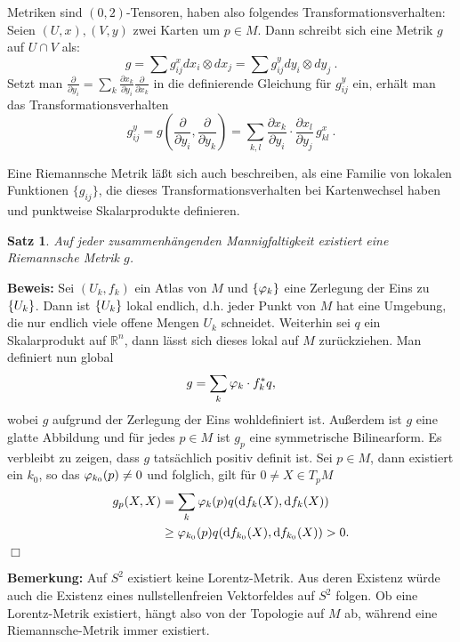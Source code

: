 \documentclass[12pt,a4paper]{article}
\def\R{\mathbb{R}}
\newtheorem{Satz}[Lemma]{Satz}
\def\proof{\noindent\textbf{Beweis:}\quad}
\def\qed{\quad\hfill\ensuremath{\Box}}
\begin{document}
\bigskip

Metriken sind $(0,2)$-Tensoren, haben also folgendes Transformationsverhalten:
Seien $(U, x), (V, y)$  zwei Karten um $p \in M$. Dann schreibt sich eine Metrik
$g$ auf $U \cap V$ als:
$$
g = \sum g_{ij}^x dx_i \otimes dx_j = \sum g_{ij}^y dy_i \otimes dy_j \ .
$$
Setzt man
$
\frac{\partial}{\partial y_i } = \sum_k \frac{\partial x_k }{\partial y_i} \frac{\partial}{\partial x_k}
$
in die definierende Gleichung f\"ur $g^y_{ij}$ ein, erh\"alt man das
Transformationsverhalten $$
g_{ij}^y
=
g\left(\frac{\partial}{\partial y_i}, \frac{\partial}{\partial y_k}\right)
=
\sum_{k, l} \frac{\partial x_k}{\partial y_i}\cdot \frac{\partial x_l }{\partial y_j}\,g_{kl}^x \ .
$$


Eine Riemannsche Metrik l\"a\ss t sich auch beschreiben, als eine Familie von lokalen
Funktionen $\{ g_{ij} \}$, die dieses Transformationsverhalten bei Kartenwechsel haben und punktweise
Skalarprodukte definieren.


\bigskip

\begin{Satz}
 Auf jeder zusammenh\"angenden Mannigfaltigkeit existiert eine Riemannsche Metrik $g$.
\end{Satz}
\proof
Sei $(U_k,f_k)$ ein Atlas von $M$ und $\{\varphi_k\}$ eine
Zerlegung der Eins zu $\{U_k\}$. Dann ist $\{U_k\}$ lokal endlich, d.h.
jeder Punkt von $M$ hat eine Umgebung, die nur endlich viele offene Mengen $U_k$
schneidet. Weiterhin sei $q$ ein Skalarprodukt auf $\R^n$, dann l\"asst sich
dieses lokal auf $M$ zur\"uckziehen. Man definiert nun global 
$$
g = \sum_{k} \varphi_k \cdot f_k^*q,
$$
wobei $g$ aufgrund der Zerlegung der Eins wohldefiniert ist. Au\ss{}erdem ist $g$ 
eine glatte Abbildung und f\"ur jedes $p\in M$ ist $g_p$ eine symmetrische
Bilinearform. Es verbleibt zu zeigen, dass $g$ tats\"achlich positiv definit ist. Sei $p\in M$, dann existiert ein
$k_0$, so das $\varphi_{k_0}(p) \neq 0$ und folglich, gilt f\"ur $0\neq X\in T_pM$
\begin{align*}
g_p(X,X) &= \sum_k \varphi_k(p) q(\mathrm{d}f_k(X),\mathrm{d}f_k(X))\\
&\ge \varphi_{k_0}(p) q(\mathrm{d}f_{k_0}(X),\mathrm{d}f_{k_0}(X)) > 0.
\end{align*}
\qed

\bigskip

{\bf Bemerkung:}
Auf $S^2$ existiert keine Lorentz-Metrik. Aus deren Existenz w\"urde
auch die Existenz eines nullstellenfreien Vektorfeldes auf $S^2$ folgen. Ob eine
Lorentz-Metrik existiert, h\"angt also von der Topologie auf $M$ ab, w\"ahrend
eine Riemannsche-Metrik immer existiert.
\end{document}
